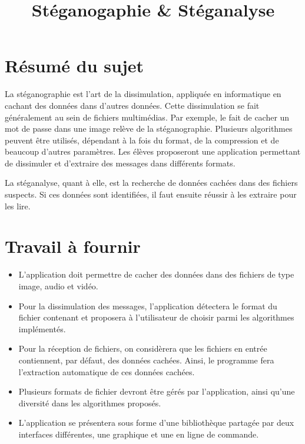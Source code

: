 \documentclass[11pt]{article}
\title{Stéganogaphie \& Stéganalyse}
\begin{document}
\maketitle

\section{Résumé du sujet}

La stéganographie est l'art de la dissimulation, appliquée en informatique en
cachant des données dans d'autres données. Cette dissimulation se fait
généralement au sein de fichiers multimédias. Par exemple, le fait de cacher un
mot de passe dans une image relève de la stéganographie. Plusieurs algorithmes
peuvent être utilisés, dépendant à la fois du format, de la compression et de
beaucoup d'autres paramètres. Les élèves proposeront une application permettant
de dissimuler et d'extraire des messages dans différents formats.

La stéganalyse, quant à elle, est la recherche de données cachées dans des
fichiers suspects. Si ces données sont identifiées, il faut ensuite réussir à
les extraire pour les lire.

\section{Travail à fournir}

\begin{itemize}
    \item L'application doit permettre de cacher des données dans des fichiers
        de type image, audio et vidéo.
    \item Pour la dissimulation des messages, l'application détectera le format
        du fichier contenant et proposera à l'utilisateur de choisir parmi les
        algorithmes implémentés. 
    \item Pour la réception de fichiers, on considèrera que les fichiers en
        entrée contiennent, par défaut, des données cachées. Ainsi, le
        programme fera l'extraction automatique de ces données cachées.
    \item Plusieurs formats de fichier devront être gérés par l'application,
        ainsi qu'une diversité dans les algorithmes proposés.
    \item L'application se présentera sous forme d'une bibliothèque partagée par
        deux interfaces différentes, une graphique et une en ligne de commande.
\end{itemize}
\end{document}
